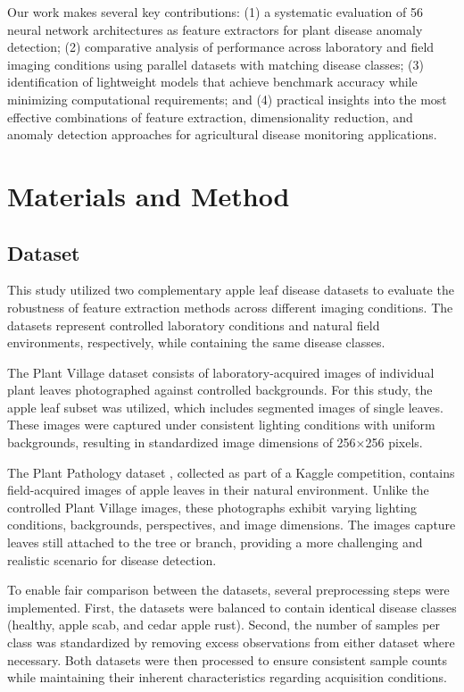 \documentclass[12pt,a4paper,oneside]{report}
\begin{document}
Our work makes several key contributions: (1) a systematic evaluation of 56 neural 
network architectures as feature extractors for plant disease anomaly detection; (2) 
comparative analysis of performance across laboratory and field imaging conditions 
using parallel datasets with matching disease classes; (3) identification of 
lightweight models that achieve benchmark accuracy while minimizing computational 
requirements; and (4) practical insights into the most effective combinations of 
feature extraction, dimensionality reduction, and anomaly detection approaches 
for agricultural disease monitoring applications.

\section{Materials and Method}

\subsection{Dataset}

This study utilized two complementary apple leaf disease datasets to evaluate the robustness of feature extraction methods across different imaging conditions. The datasets represent controlled laboratory conditions and natural field environments, respectively, while containing the same disease classes.

The Plant Village dataset \cite{hughesOpenAccessRepository2016} consists of laboratory-acquired images of individual plant leaves photographed against controlled backgrounds. For this study, the apple leaf subset was utilized, which includes segmented images of single leaves. These images were captured under consistent lighting conditions with uniform backgrounds, resulting in standardized image dimensions of 256×256 pixels.

The Plant Pathology dataset \cite{thapaPlantPathology20202020}, collected as part of a Kaggle competition, contains field-acquired images of apple leaves in their natural environment. Unlike the controlled Plant Village images, these photographs exhibit varying lighting conditions, backgrounds, perspectives, and image dimensions. The images capture leaves still attached to the tree or branch, providing a more challenging and realistic scenario for disease detection.

To enable fair comparison between the datasets, several preprocessing steps were implemented. First, the datasets were balanced to contain identical disease classes (healthy, apple scab, and cedar apple rust). Second, the number of samples per class was standardized by removing excess observations from either dataset where necessary. Both datasets were then processed to ensure consistent sample counts while maintaining their inherent characteristics regarding acquisition conditions.
\end{document}
